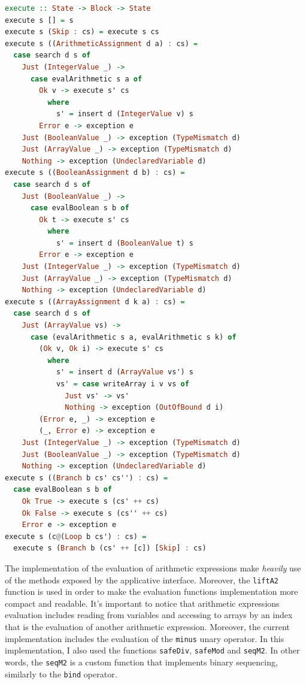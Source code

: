 \documentclass[12pt,a4paper]{article}
\begin{document}
\begin{lstlisting}[language=Haskell, style=custom-style]
execute :: State -> Block -> State
execute s [] = s
execute s (Skip : cs) = execute s cs
execute s ((ArithmeticAssignment d a) : cs) =
  case search d s of
    Just (IntegerValue _) ->
      case evalArithmetic s a of
        Ok v -> execute s' cs
          where
            s' = insert d (IntegerValue v) s
        Error e -> exception e
    Just (BooleanValue _) -> exception (TypeMismatch d)
    Just (ArrayValue _) -> exception (TypeMismatch d)
    Nothing -> exception (UndeclaredVariable d)
execute s ((BooleanAssignment d b) : cs) =
  case search d s of
    Just (BooleanValue _) ->
      case evalBoolean s b of
        Ok t -> execute s' cs
          where
            s' = insert d (BooleanValue t) s
        Error e -> exception e
    Just (IntegerValue _) -> exception (TypeMismatch d)
    Just (ArrayValue _) -> exception (TypeMismatch d)
    Nothing -> exception (UndeclaredVariable d)
execute s ((ArrayAssignment d k a) : cs) =
  case search d s of
    Just (ArrayValue vs) ->
      case (evalArithmetic s a, evalArithmetic s k) of
        (Ok v, Ok i) -> execute s' cs
          where
            s' = insert d (ArrayValue vs') s
            vs' = case writeArray i v vs of
              Just vs' -> vs'
              Nothing -> exception (OutOfBound d i)
        (Error e, _) -> exception e
        (_, Error e) -> exception e
    Just (IntegerValue _) -> exception (TypeMismatch d)
    Just (BooleanValue _) -> exception (TypeMismatch d)
    Nothing -> exception (UndeclaredVariable d)
execute s ((Branch b cs' cs'') : cs) =
  case evalBoolean s b of
    Ok True -> execute s (cs' ++ cs)
    Ok False -> execute s (cs'' ++ cs)
    Error e -> exception e
execute s (c@(Loop b cs') : cs) =
  execute s (Branch b (cs' ++ [c]) [Skip] : cs)
\end{lstlisting}
The implementation of the evaluation of arithmetic expressions make \textit{heavily} use of the methods exposed by the applicative interface.
Moreover, the \texttt{liftA2} function is used in order to make the evaluation functions implementation more compact and readable.
It's important to notice that arithmetic expressions evaluation includes reading from variables and accessing to arrays by an index that is the evaluation of another arithmetic expression.
Moreover, the current implementation includes the evaluation of the \texttt{minus} unary operator.
In this implementation, I also used the functions \texttt{safeDiv}, \texttt{safeMod} and \texttt{seqM2}.
In other words, the \texttt{seqM2} is a custom function that implements binary sequencing, similarly to the \texttt{bind} operator.
\end{document}
